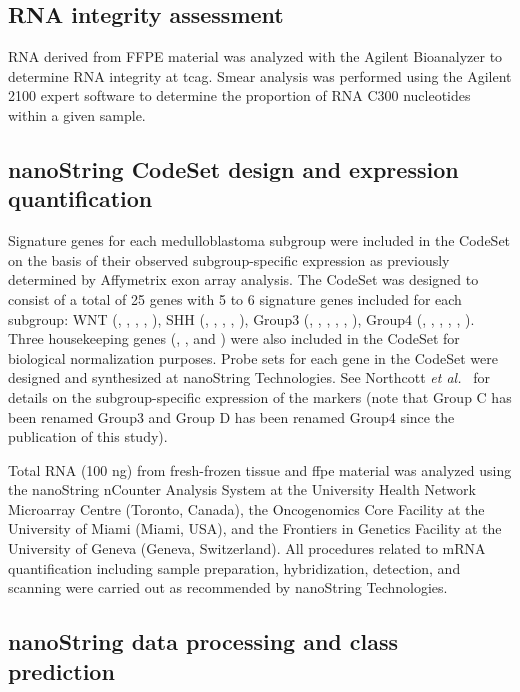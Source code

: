 \subsection{RNA integrity assessment}

RNA derived from FFPE material was analyzed with the Agilent Bioanalyzer to determine RNA integrity at \gls{tcag}. Smear analysis was performed using the Agilent 2100 expert software to determine the proportion of RNA C300 nucleotides within a given sample.

\subsection{nanoString CodeSet design and expression quantification}

Signature genes for each medulloblastoma subgroup were included in the CodeSet on the basis of their observed subgroup-specific expression as previously determined by Affymetrix exon array analysis. The CodeSet was designed to consist of a total of 25 genes with 5 to 6 signature genes included for each subgroup: WNT (, , , , ), SHH (, , , , ), Group3 (, , , , , ), Group4 (, , , , , ).  Three housekeeping genes (, , and ) were also included in the CodeSet for biological normalization purposes. Probe sets for each gene in the CodeSet were designed and synthesized at nanoString Technologies. See Northcott \emph{et al.}\  for details on the subgroup-specific expression of the markers (note that Group C has been renamed Group3 and Group D has been renamed Group4 since the publication of this study).

Total RNA (100 ng) from fresh-frozen tissue and \gls{ffpe} material was analyzed using the nanoString nCounter Analysis System at the University Health Network Microarray Centre (Toronto, Canada), the Oncogenomics Core Facility at the University of Miami (Miami, USA), and the Frontiers in Genetics Facility at the University of Geneva (Geneva, Switzerland). All procedures related to mRNA quantification including sample preparation, hybridization, detection, and scanning were carried out as recommended by nanoString Technologies.

\subsection{nanoString data processing and class prediction}


